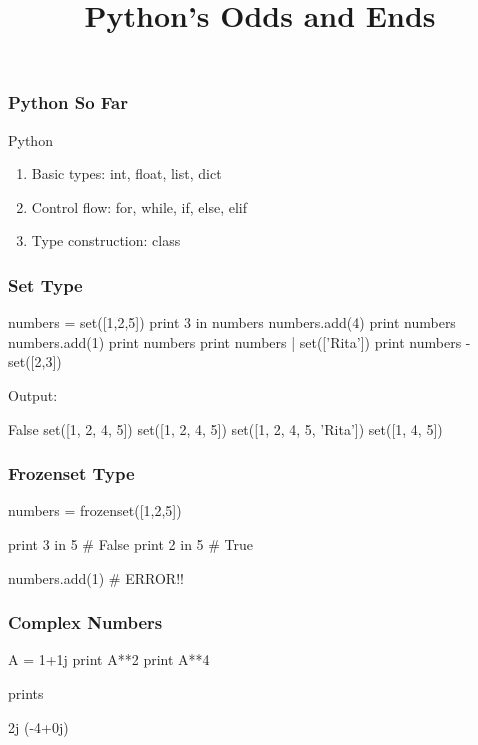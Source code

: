 
\title{Python's Odds and Ends}

\frame{\maketitle}

\begin{frame}[fragile] %
\frametitle{Python So Far}

\begin{block}{Python}
\begin{enumerate}
\item Basic types: int, float, list, dict
\item Control flow: for, while, if, else, elif
\item Type construction: class
\end{enumerate}
\end{block}

\end{frame}

\begin{frame}[fragile] %
\frametitle{Set Type}
\begin{python}
numbers = set([1,2,5])
print 3 in numbers
numbers.add(4)
print numbers
numbers.add(1)
print numbers
print numbers | set(['Rita'])
print numbers - set([2,3])
\end{python}

Output:
\begin{python}
False
set([1, 2, 4, 5])
set([1, 2, 4, 5])
set([1, 2, 4, 5, 'Rita'])
set([1, 4, 5])
\end{python}

\end{frame}

\begin{frame}[fragile] %
\frametitle{Frozenset Type}

\begin{python}
numbers = frozenset([1,2,5])

print 3 in 5 # False
print 2 in 5 # True

numbers.add(1) # ERROR!!
\end{python}

\end{frame}

\begin{frame}[fragile] %
\frametitle{Complex Numbers}
\begin{python}
A = 1+1j
print A**2
print A**4
\end{python}

prints

\begin{python}
2j
(-4+0j)
\end{python}
\end{frame}

